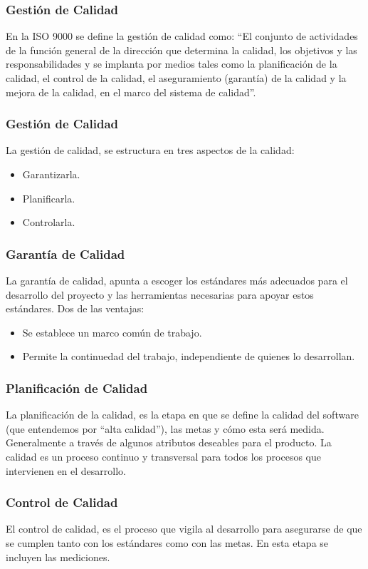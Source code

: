 \documentclass[12pt]{beamer}
\begin{document}
\begin{frame}
\frametitle{Gestión de Calidad}
En la ISO 9000 se define la gestión de calidad como:
\pause
``El conjunto de actividades de la función general de la dirección que determina la calidad, los objetivos y las responsabilidades y se
implanta por medios tales como la planificación de la calidad, el control de la calidad, el aseguramiento (garantía) de la calidad y la
mejora de la calidad, en el marco del sistema de calidad''.
\end{frame}



\begin{frame}
\frametitle{Gestión de Calidad}
La gestión de calidad, se estructura en tres aspectos de la calidad:
\begin{itemize}
 \item<2-> Garantizarla.
 \item<3-> Planificarla.
 \item<4-> Controlarla.
\end{itemize}
\end{frame}


\begin{frame}
\frametitle{Garantía de Calidad}
La garantía de calidad, apunta a escoger los estándares más adecuados para el desarrollo del proyecto y las herramientas necesarias 
para apoyar estos estándares. Dos de las ventajas:
\begin{itemize}
 \item<2-> Se establece un marco común de trabajo.
 \item<3-> Permite la continuedad del trabajo, independiente de quienes lo desarrollan.
\end{itemize}

\end{frame}

\begin{frame}
\frametitle{Planificación de Calidad}
La planificación de la calidad, es la etapa en que se define la calidad del software (que entendemos por ``alta calidad''), las metas y 
cómo esta será \alert{medida}. 
Generalmente a través de algunos atributos deseables para el producto.
La calidad es un proceso continuo y transversal para \alert{todos} los procesos que intervienen en el desarrollo.
\end{frame}

\begin{frame}
\frametitle{Control de Calidad}
El control de calidad, es el proceso que vigila al desarrollo para asegurarse de que se cumplen tanto con los estándares como con las 
metas. En esta etapa se incluyen las mediciones.
\end{frame}
\end{document}

